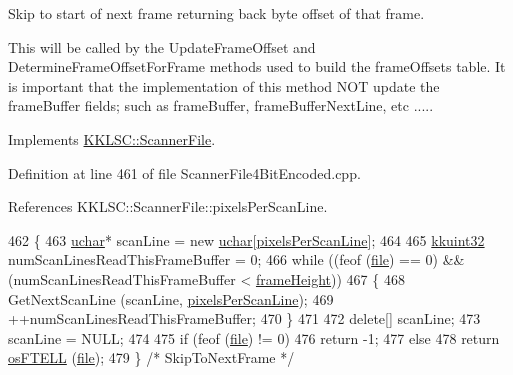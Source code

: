 Skip to start of next frame returning back byte offset of that frame. 

This will be called by the \textquotesingle{}Update\+Frame\+Offset\textquotesingle{} and \textquotesingle{}Determine\+Frame\+Offset\+For\+Frame\textquotesingle{} methods used to build the \textquotesingle{}frame\+Offsets\textquotesingle{} table. It is important that the implementation of this method N\+OT update the frame\+Buffer fields; such as \textquotesingle{}frame\+Buffer\textquotesingle{}, \textquotesingle{}frame\+Buffer\+Next\+Line\textquotesingle{}, etc ..... 

Implements \hyperlink{class_k_k_l_s_c_1_1_scanner_file_a1797e4ba35b312c53da2c453f1303f35}{K\+K\+L\+S\+C\+::\+Scanner\+File}.



Definition at line 461 of file Scanner\+File4\+Bit\+Encoded.\+cpp.



References K\+K\+L\+S\+C\+::\+Scanner\+File\+::pixels\+Per\+Scan\+Line.


\begin{DoxyCode}
462 \{
463   \hyperlink{namespace_k_k_b_ace9969169bf514f9ee6185186949cdf7}{uchar}*  scanLine = \textcolor{keyword}{new} \hyperlink{namespace_k_k_b_ace9969169bf514f9ee6185186949cdf7}{uchar}[\hyperlink{class_k_k_l_s_c_1_1_scanner_file_a07b4ac6b33c35ad0148c7a1422c73cfe}{pixelsPerScanLine}];
464 
465   \hyperlink{namespace_k_k_b_af8d832f05c54994a1cce25bd5743e19a}{kkuint32}  numScanLinesReadThisFrameBuffer = 0;
466   \textcolor{keywordflow}{while}  ((feof (\hyperlink{class_k_k_l_s_c_1_1_scanner_file_a26db15f7823ce67b1621da17468ec807}{file}) == 0)  &&  (numScanLinesReadThisFrameBuffer < 
      \hyperlink{class_k_k_l_s_c_1_1_scanner_file_a5598193d137fb79782cc1967ec830625}{frameHeight}))
467   \{
468     GetNextScanLine (scanLine, \hyperlink{class_k_k_l_s_c_1_1_scanner_file_a07b4ac6b33c35ad0148c7a1422c73cfe}{pixelsPerScanLine});
469     ++numScanLinesReadThisFrameBuffer;
470   \}
471 
472   \textcolor{keyword}{delete}[]  scanLine;
473   scanLine = NULL;
474 
475   \textcolor{keywordflow}{if}  (feof (\hyperlink{class_k_k_l_s_c_1_1_scanner_file_a26db15f7823ce67b1621da17468ec807}{file}) != 0)
476     \textcolor{keywordflow}{return} -1;
477   \textcolor{keywordflow}{else}
478     \textcolor{keywordflow}{return} \hyperlink{namespace_k_k_b_a2cc11a5ae09d10d69ad751b549e5d94e}{osFTELL} (\hyperlink{class_k_k_l_s_c_1_1_scanner_file_a26db15f7823ce67b1621da17468ec807}{file});
479 \}  \textcolor{comment}{/* SkipToNextFrame */}
\end{DoxyCode}
